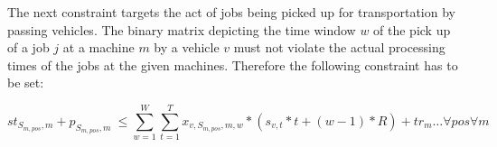 The next constraint targets the act of jobs being picked up for transportation by passing vehicles. The binary matrix depicting the
time window \(w\) of the pick up of a job \(j\) at a machine \(m\) by a vehicle \(v\) must not violate the actual processing times of the jobs at
the given machines. Therefore the following constraint has to be set:

\begin{equation}
  st_{S_{m,pos},m} + p_{S_{m,pos},m}\> \leq \sum_{w=1}^{W}\sum_{t=1}^{T} x_{v,S_{m,pos},m,w} * (s_{v,t} * t + (w-1) * R) + tr_{m} \ldots \forall pos \forall m
\end{equation}